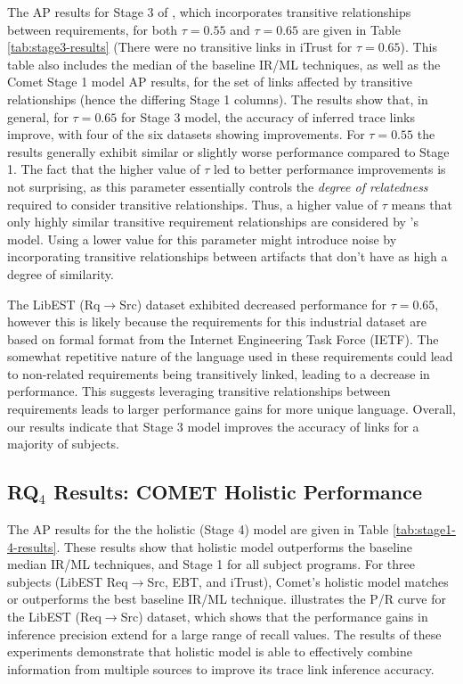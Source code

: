 The AP results for Stage 3 of \Comet, which incorporates transitive relationships between requirements, for both $\tau=0.55$ and $\tau=0.65$ are given in Table \ref{tab:stage3-results} (There were no transitive links in iTrust for $\tau=0.65$). This table also includes the median of the baseline IR/ML techniques, as well as the Comet Stage 1 model AP results, for the set of links affected by transitive relationships (hence the differing Stage 1 columns). The results show that, in general, for $\tau=0.65$ for \Comets Stage 3 model, the accuracy of \Comets inferred trace links improve, with four of the six datasets showing improvements. For $\tau=0.55$ the results generally exhibit similar or slightly worse performance compared to Stage 1.  The fact that the higher value of $\tau$ led to better performance improvements is not surprising, as this parameter essentially controls the \textit{degree of relatedness} required to consider transitive relationships. Thus, a higher value of $\tau$ means that only highly similar transitive requirement relationships are considered by \Comet's model. Using a lower value for this parameter might introduce noise by incorporating transitive relationships between artifacts that don't have as high a degree of similarity. 

The LibEST (Rq$\rightarrow$Src) dataset exhibited decreased performance for $\tau=0.65$, however this is likely because the requirements for this industrial dataset are based on formal format from the Internet Engineering Task Force (IETF). The somewhat repetitive nature of the language used in these requirements could lead to non-related requirements being transitively linked, leading to a decrease in performance. This suggests leveraging transitive relationships between requirements leads to larger performance gains for more unique language. Overall, our results indicate that \Comets Stage 3 model improves the accuracy of links for a majority of subjects.

\subsection{RQ$_4$ Results: C{\footnotesize OMET} Holistic Performance}
\label{sub:results-rq4}

The AP results for the the holistic \Comet (Stage 4) model are given in Table \ref{tab:stage1-4-results}. These results show that \Comets holistic model outperforms the baseline median IR/ML techniques, and Stage 1 for all subject programs. For three subjects (LibEST Req$\rightarrow$Src, EBT, and iTrust), Comet's holistic model matches or outperforms the best baseline IR/ML technique.  illustrates the P/R curve for the LibEST (Req$\rightarrow$Src) dataset, which shows that the performance gains in inference precision extend for a large range of recall values. The results of these experiments demonstrate that \Comets holistic model is able to effectively combine information from multiple sources to improve its trace link inference accuracy.


